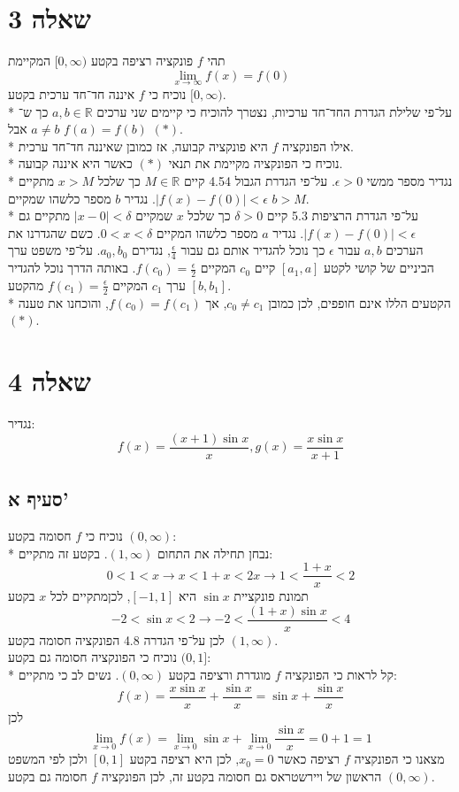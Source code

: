 \documentclass[a4paper]{article}
\def\RR{\mathbb{R}}
\begin{document}
\section{שאלה 3}
תהי $f$ פונקציה רציפה בקטע $[0, \infty)$ המקיימת %
\[
	\lim_{x \to \infty} f(x) = f(0)
\]
נוכיח כי $f$ איננה חד־חד ערכית בקטע $[0, \infty)$. \\* %
על־פי שלילת הגדרת החד־חד ערכיות, נצטרך להוכיח כי קיימים שני ערכים $a, b \in \RR$ כך ש־$a \ne b$ אבל $f(a) = f(b)$ $(*)$. \\*
אילו הפונקציה $f$ היא פונקציה קבועה, אז כמובן שאיננה חד־חד ערכית. \\*
נוכיח כי הפונקציה מקיימת את תנאי $(*)$ כאשר היא איננה קבועה. \\*
נגדיר מספר ממשי $\epsilon > 0$.
על־פי הגדרת הגבול 4.54 קיים $M \in \RR$ כך שלכל $x > M$ מתקיים $|f(x) - f(0)| < \epsilon$. נגדיר $b$ מספר כלשהו שמקיים $b > M$. \\*
על־פי הגדרת הרציפות 5.3 קיים $\delta > 0$ כך שלכל $x$ שמקיים $|x - 0| < \delta$ מתקיים גם $|f(x) - f(0)| < \epsilon$.
נגדיר $a$ מספר כלשהו המקיים $0 < x < \delta$.
כשם שהגדרנו את הערכים $a, b$ עבור $\epsilon$ כך נוכל להגדיר אותם גם עבור $\frac{\epsilon}{4}$, נגדירם $a_0, b_0$.
על־פי משפט ערך הביניים של קושי לקטע $[a_1, a]$ קיים $c_0$ המקיים $f(c_0) = \frac{\epsilon}{2}$.
באותה הדרך נוכל להגדיר ערך $c_1$ המקיים $f(c_1) = \frac{\epsilon}{2}$ מהקטע $[b, b_1]$. \\*
הקטעים הללו אינם חופפים, לכן כמובן $c_0 \ne c_1$, אך $f(c_0) = f(c_1)$, והוכחנו את טענה $(*)$.

\section{שאלה 4}
נגדיר:
\[
	f(x) = \frac{(x + 1) \sin x}{x},
	g(x) = \frac{x \sin x}{x + 1}
\]

\subsection{סעיף א'}
נוכיח כי $f$ חסומה בקטע $(0, \infty)$: \\*
נבחן תחילה את התחום $(1, \infty)$. בקטע זה מתקיים:
\[
	0 < 1 < x \rightarrow
	x < 1 + x < 2x \rightarrow
	1 < \frac{1 + x}{x} < 2 \tag{\#}
\]
תמונת פונקציית $\sin x$ היא $[-1, 1]$, לכןמתקיים לכל $x$ בקטע
\[
	-2 < \sin x < 2 \rightarrow -2 < \frac{(1 + x) \sin x}{x} < 4
\]
לכן על־פי הגדרה 4.8 הפונקציה חסומה בקטע $(1, \infty)$. \\
נוכיח כי הפונקציה חסומה גם בקטע $(0, 1]$: \\* %
קל לראות כי הפונקציה $f$ מוגדרת ורציפה בקטע $(0, \infty)$. 
נשים לב כי מתקיים:
\[
	f(x) = \frac{x \sin x}{x} + \frac{\sin x}{x} = \sin x + \frac{\sin x}{x}
\]
לכן
\[
	\lim_{x \to 0} f(x) = \lim_{x \to 0} \sin x + \lim_{x \to 0} \frac{\sin x}{x} = 0 + 1 = 1
\]
מצאנו כי הפונקציה $f$ רציפה כאשר $x_0 = 0$, לכן היא רציפה בקטע $[0, 1]$ ולכן לפי המשפט הראשון של ויירשטראס גם חסומה בקטע זה,
לכן הפונקציה $f$ חסומה גם בקטע $(0, \infty)$.
\end{document}
